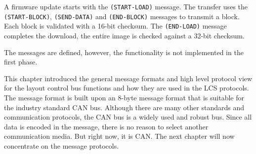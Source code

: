 \begin{table}[ht!]
    \centering 
\end{table}

A firmware update starts with the \texttt{(START-LOAD)} message. The transfer uses the \texttt{(START-BLOCK)}, \texttt{(SEND-DATA)} and \texttt{(END-BLOCK)} messages to transmit a block. Each block is validated with a 16-bit checksum. The \texttt{(END-LOAD)} message completes the download, the entire image is checked against a 32-bit checksum.

The messages are defined, however, the functionality is not implemented in the first phase.


This chapter introduced the general message formats and high level protocol view for the layout control bus functions and how they are used in the LCS protocols. The message format is built upon an 8-byte message format that is suitable for the industry standard CAN bus. Although there are many other standards and communication protocols, the CAN bus is a widely used and robust bus. Since all data is encoded in the message, there is no reason to select another communication media. But right now, it is CAN. The next chapter will now concentrate on the message protocols.
